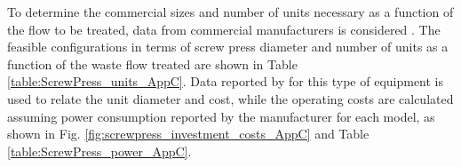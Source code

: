 \begin{refsection}[referencesCh4]
To determine the commercial sizes and number of units necessary as a function of the flow to be treated, data from commercial manufacturers is considered \citep{PWTech}. The feasible configurations in terms of screw press diameter and number of units as a function of the waste flow treated are shown in Table \ref{table:ScrewPress_units_AppC}. Data reported by \citet{Matches} for this type of equipment is used to relate the unit diameter and cost, while the operating costs are calculated assuming power consumption reported by the manufacturer for each model, as shown in Fig. \ref{fig:screwpress_investment_costs_AppC} and Table \ref{table:ScrewPress_power_AppC}.
\begin{table}[h] 
		\centering
		\caption{Sizing estimated for screw press units based on commercial data \protect\citep{PWTech}.} \label{table:ScrewPress_units_AppC}
\end{table}


\end{refsection}
